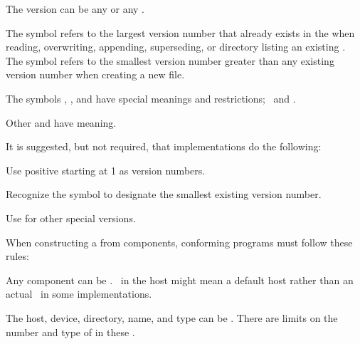 \endsubsubsubsection%


The version can be any  or any .  

The symbol  refers to the largest version number 
that already exists in the 
when reading, overwriting, appending, superseding, or directory listing 
an existing .
The symbol  refers to the smallest version number
greater than any existing version number when creating a new file.

The symbols \nil, , and  have special meanings and
restrictions; \seesection\SpecialComponentValues\ and \secref\ConstructingPathnames.

Other  and 
have  meaning.


It is suggested, but not required, that implementations do the following:

\beginlist

\itemitem{\bull} Use positive  starting at 1 as version numbers.

\itemitem{\bull} Recognize the symbol 
		 to designate the smallest existing version number.

\itemitem{\bull} Use  for other special versions.

\endlist

\endsubsubsubsection%


  When constructing a  from components, conforming programs
  must follow these rules:
  
\beginlist

\itemitem{\bull}
  Any component can be \nil.
  \nil\ in the host might mean a default host 
  rather than an actual \nil\ in some implementations.
           
\itemitem{\bull}
  The host, device, directory, name, and type can be .  There
  are  limits on the number and type of
   in these .
  
